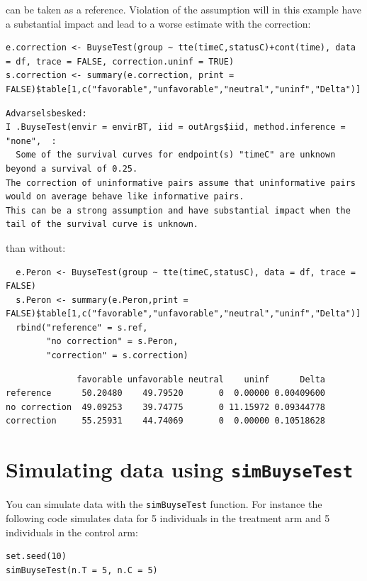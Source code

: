 \documentclass[12pt]{article}
\begin{document}
can be taken as a reference. Violation of the assumption will in this
example have a substantial impact and lead to a worse estimate with
the correction:
\lstset{language=r,label= ,caption= ,captionpos=b,numbers=none}
\begin{lstlisting}
e.correction <- BuyseTest(group ~ tte(timeC,statusC)+cont(time), data = df, trace = FALSE, correction.uninf = TRUE)
s.correction <- summary(e.correction, print = FALSE)$table[1,c("favorable","unfavorable","neutral","uninf","Delta")]
\end{lstlisting}

\begin{verbatim}
Advarselsbesked:
I .BuyseTest(envir = envirBT, iid = outArgs$iid, method.inference = "none",  :
  Some of the survival curves for endpoint(s) "timeC" are unknown beyond a survival of 0.25.
The correction of uninformative pairs assume that uninformative pairs would on average behave like informative pairs. 
This can be a strong assumption and have substantial impact when the tail of the survival curve is unknown.
\end{verbatim}


than without:
\lstset{language=r,label= ,caption= ,captionpos=b,numbers=none}
\begin{lstlisting}
  e.Peron <- BuyseTest(group ~ tte(timeC,statusC), data = df, trace = FALSE)
  s.Peron <- summary(e.Peron,print = FALSE)$table[1,c("favorable","unfavorable","neutral","uninf","Delta")]
  rbind("reference" = s.ref,
        "no correction" = s.Peron,
        "correction" = s.correction)
\end{lstlisting}
\begin{verbatim}
              favorable unfavorable neutral    uninf      Delta
reference      50.20480    49.79520       0  0.00000 0.00409600
no correction  49.09253    39.74775       0 11.15972 0.09344778
correction     55.25931    44.74069       0  0.00000 0.10518628
\end{verbatim}


\clearpage

\section{Simulating data using \texttt{simBuyseTest}}
\label{sec:org9621a04}
You can simulate data with the \texttt{simBuyseTest} function. For instance
the following code simulates data for 5 individuals in the treatment
arm and 5 individuals in the control arm:
\lstset{language=r,label= ,caption= ,captionpos=b,numbers=none}
\begin{lstlisting}
set.seed(10)
simBuyseTest(n.T = 5, n.C = 5)
\end{lstlisting}
\end{document}
